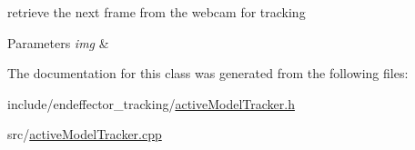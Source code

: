 retrieve the next frame from the webcam for tracking 


\begin{DoxyParams}{\-Parameters}
{\em img} & \\
\hline
\end{DoxyParams}


\-The documentation for this class was generated from the following files\-:\begin{DoxyCompactItemize}
\item 
include/endeffector\-\_\-tracking/\hyperlink{activeModelTracker_8h}{active\-Model\-Tracker.\-h}\item 
src/\hyperlink{activeModelTracker_8cpp}{active\-Model\-Tracker.\-cpp}\end{DoxyCompactItemize}
